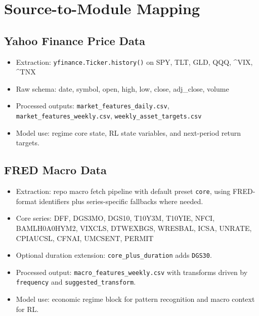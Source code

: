 \documentclass[11pt,a4paper]{article}
\begin{document}
            \section{Source-to-Module Mapping}

            \subsection{Yahoo Finance Price Data}
            \begin{itemize}[leftmargin=1.4em]
              \item Extraction: \texttt{yfinance.Ticker.history()} on SPY, TLT, GLD, QQQ, \textasciicircum{}VIX, \textasciicircum{}TNX
              \item Raw schema: date, symbol, open, high, low, close, adj\_close, volume
              \item Processed outputs: \texttt{market\_features\_daily.csv}, \texttt{market\_features\_weekly.csv}, \texttt{weekly\_asset\_targets.csv}
              \item Model use: regime core state, RL state variables, and next-period return targets.
            \end{itemize}

            \subsection{FRED Macro Data}
            \begin{itemize}[leftmargin=1.4em]
              \item Extraction: repo macro fetch pipeline with default preset \texttt{core}, using FRED-format identifiers plus series-specific fallbacks where needed.
              \item Core series: DFF, DGS3MO, DGS10, T10Y3M, T10YIE, NFCI, BAMLH0A0HYM2, VIXCLS, DTWEXBGS, WRESBAL, ICSA, UNRATE, CPIAUCSL, CFNAI, UMCSENT, PERMIT
              \item Optional duration extension: \texttt{core\_plus\_duration} adds \texttt{DGS30}.
              \item Processed output: \texttt{macro\_features\_weekly.csv} with transforms driven by \texttt{frequency} and \texttt{suggested\_transform}.
              \item Model use: economic regime block for pattern recognition and macro context for RL.
            \end{itemize}
\end{document}

